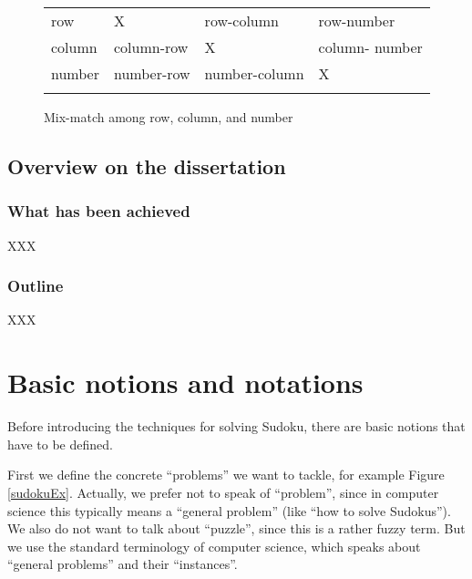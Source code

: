 \documentclass[11pt]{report}
\begin{document}
\begin{figure}[htbp]
\setlength{\tabcolsep}{3pt}
\renewcommand{\arraystretch}{2}
\begin{center}
\begin{tabular}{ >{\centering\arraybackslash}m{0.6in}|| >{\centering\arraybackslash}m{1.2in}|| >{\centering\arraybackslash}m{1.2in}|| >{\centering\arraybackslash}m{1.2in}||}
\multicolumn{1}{c}{} & \multicolumn{1}{c}{row} & \multicolumn{1}{c}{column} & \multicolumn{1}{c}{number}\\ \cline{2-4}
row & X & row-column & row-number\\ \cline{2-4}
column & column-row \cellcolor[gray]{.8}& X& column- number\\ \cline{2-4}
number & number-row \cellcolor[gray]{.8}& number-column \cellcolor[gray]{.8}& X\\ \cline{2-4}
\end{tabular}
\end{center}
\caption{Mix-match among row, column, and number}
\label{fig:mixmatch}
\end{figure}


\section{Overview on the dissertation}
\label{sec:overview}


\subsection{What has been achieved}
\label{sec:whatachieved}

XXX



\subsection{Outline}
\label{sec:OUtline}

XXX




\chapter{Basic notions and notations}
\label{cha:basicnotnotat}

Before introducing the techniques for solving Sudoku, there are basic notions that have to be defined.

First we define the concrete ``problems'' we want to tackle, for example Figure \ref{sudokuEx}. Actually, we prefer not to speak of ``problem'', since in computer science this typically means a ``general problem'' (like ``how to solve Sudokus''). We also do not want to talk about ``puzzle'', since this is a rather fuzzy term. But we use the standard terminology of computer science, which speaks about ``general problems'' and their ``instances''.
\end{document}
